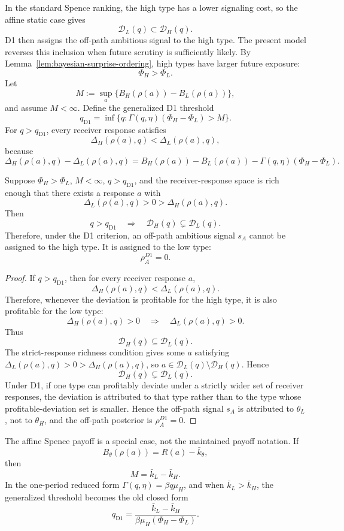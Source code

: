In the standard Spence ranking, the high type has a lower signaling cost, so the affine static case gives
\[
\mathcal D_L(q)\subset \mathcal D_H(q).
\]
D1 then assigns the off-path ambitious signal to the high type. The present model reverses this inclusion when future scrutiny is sufficiently likely. By Lemma~\ref{lem:bayesian-surprise-ordering}, high types have larger future exposure:
\[
\Phi_H>\Phi_L.
\]
Let
\[
M:=\sup_{a}\{B_H(\rho(a))-B_L(\rho(a))\},
\]
and assume \(M<\infty\). Define the generalized D1 threshold
\[
q_{\mathrm{D1}}
=
\inf\{q:\Gamma(q,\eta)(\Phi_H-\Phi_L)>M\}.
\]
For \(q>q_{\mathrm{D1}}\), every receiver response satisfies
\[
\Delta_H(\rho(a),q)<\Delta_L(\rho(a),q),
\]
because
\[
\Delta_H(\rho(a),q)-\Delta_L(\rho(a),q)
=
B_H(\rho(a))-B_L(\rho(a))
-\Gamma(q,\eta)(\Phi_H-\Phi_L).
\]

\begin{proposition}[D1 reversal]
\label{prop:d1-reversal}
\label{lem:d1-off-path-reversal}
Suppose \(\Phi_H>\Phi_L\), \(M<\infty\), \(q>q_{\mathrm{D1}}\), and the receiver-response space is rich enough that there exists a response \(a\) with
\[
\Delta_L(\rho(a),q)>0>\Delta_H(\rho(a),q).
\]
Then
\[
q>q_{\mathrm{D1}}
\quad\Rightarrow\quad
\mathcal D_H(q)\subsetneq \mathcal D_L(q).
\]
Therefore, under the D1 criterion, an off-path ambitious signal \(s_A\) cannot be assigned to the high type. It is assigned to the low type:
\[
\rho_A^{D1}=0.
\]
\end{proposition}

\begin{proof}
If \(q>q_{\mathrm{D1}}\), then for every receiver response \(a\),
\[
\Delta_H(\rho(a),q)<\Delta_L(\rho(a),q).
\]
Therefore, whenever the deviation is profitable for the high type, it is also profitable for the low type:
\[
\Delta_H(\rho(a),q)>0
\quad\Rightarrow\quad
\Delta_L(\rho(a),q)>0.
\]
Thus
\[
\mathcal D_H(q)\subseteq\mathcal D_L(q).
\]
The strict-response richness condition gives some \(a\) satisfying \(\Delta_L(\rho(a),q)>0>\Delta_H(\rho(a),q)\), so \(a\in\mathcal D_L(q)\setminus\mathcal D_H(q)\). Hence
\[
\mathcal D_H(q)\subsetneq\mathcal D_L(q).
\]
Under D1, if one type can profitably deviate under a strictly wider set of receiver responses, the deviation is attributed to that type rather than to the type whose profitable-deviation set is smaller. Hence the off-path signal \(s_A\) is attributed to \(\theta_L\), not to \(\theta_H\), and the off-path posterior is \(\rho_A^{D1}=0\).
\end{proof}

The affine Spence payoff is a special case, not the maintained payoff notation. If
\[
B_\theta(\rho(a))=R(a)-\bar k_\theta,
\]
then
\[
M=\bar k_L-\bar k_H.
\]
In the one-period reduced form \(\Gamma(q,\eta)=\beta q\mu_H\), and when \(\bar k_L>\bar k_H\), the generalized threshold becomes the old closed form
\[
q_{\mathrm{D1}}
=
\frac{\bar k_L-\bar k_H}{\beta\mu_H(\Phi_H-\Phi_L)}.
\]

